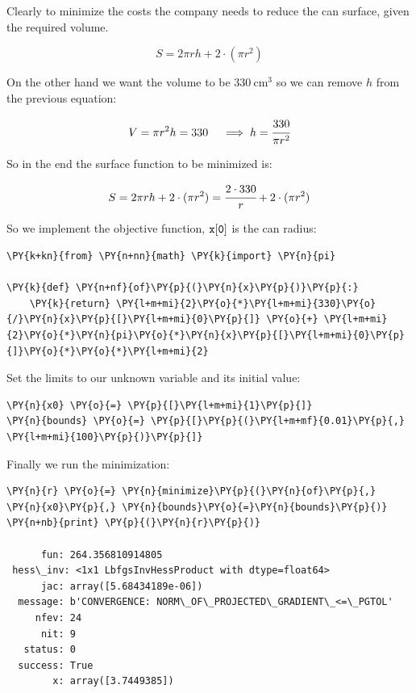 Clearly to minimize the costs the company needs to reduce the can
surface, given the required volume.

\[ S = 2\pi rh + 2\cdot(\pi r^2) \]

On the other hand we want the volume to be \(330~\mathrm{cm}^3\) so we
can remove \(h\) from the previous equation:

\[ V = \pi r^2 h = 330\quad\implies h = \cfrac{330}{\pi r^2} \]

So in the end the surface function to be minimized is:

\[ S = 2\pi rh + 2\cdot(\pi r^2) = \cfrac{2\cdot 330}{r} + 2\cdot(\pi r^2)\]

So we implement the objective function, \(\tt{x[0]}\) is the can radius:

\begin{tcolorbox}[breakable, size=fbox, boxrule=1pt, pad at break*=1mm,colback=cellbackground, colframe=cellborder]
\begin{Verbatim}[commandchars=\\\{\}]
\PY{k+kn}{from} \PY{n+nn}{math} \PY{k}{import} \PY{n}{pi}

\PY{k}{def} \PY{n+nf}{of}\PY{p}{(}\PY{n}{x}\PY{p}{)}\PY{p}{:}
    \PY{k}{return} \PY{l+m+mi}{2}\PY{o}{*}\PY{l+m+mi}{330}\PY{o}{/}\PY{n}{x}\PY{p}{[}\PY{l+m+mi}{0}\PY{p}{]} \PY{o}{+} \PY{l+m+mi}{2}\PY{o}{*}\PY{n}{pi}\PY{o}{*}\PY{n}{x}\PY{p}{[}\PY{l+m+mi}{0}\PY{p}{]}\PY{o}{*}\PY{o}{*}\PY{l+m+mi}{2}
\end{Verbatim}
\end{tcolorbox}

Set the limits to our unknown variable and its initial value:

\begin{tcolorbox}[breakable, size=fbox, boxrule=1pt, pad at break*=1mm,colback=cellbackground, colframe=cellborder]
\begin{Verbatim}[commandchars=\\\{\}]
\PY{n}{x0} \PY{o}{=} \PY{p}{[}\PY{l+m+mi}{1}\PY{p}{]}
\PY{n}{bounds} \PY{o}{=} \PY{p}{[}\PY{p}{(}\PY{l+m+mf}{0.01}\PY{p}{,} \PY{l+m+mi}{100}\PY{p}{)}\PY{p}{]}
\end{Verbatim}
\end{tcolorbox}

    Finally we run the minimization:

    \begin{tcolorbox}[breakable, size=fbox, boxrule=1pt, pad at break*=1mm,colback=cellbackground, colframe=cellborder]
\begin{Verbatim}[commandchars=\\\{\}]
\PY{n}{r} \PY{o}{=} \PY{n}{minimize}\PY{p}{(}\PY{n}{of}\PY{p}{,} \PY{n}{x0}\PY{p}{,} \PY{n}{bounds}\PY{o}{=}\PY{n}{bounds}\PY{p}{)}
\PY{n+nb}{print} \PY{p}{(}\PY{n}{r}\PY{p}{)}

      fun: 264.356810914805
 hess\_inv: <1x1 LbfgsInvHessProduct with dtype=float64>
      jac: array([5.68434189e-06])
  message: b'CONVERGENCE: NORM\_OF\_PROJECTED\_GRADIENT\_<=\_PGTOL'
     nfev: 24
      nit: 9
   status: 0
  success: True
        x: array([3.7449385])
    \end{Verbatim}
\end{tcolorbox}

